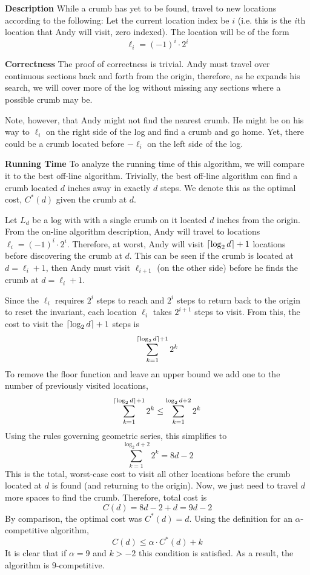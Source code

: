 \documentclass[12pt,twoside]{article}
\begin{document}
\begin{problems}

\problem  %

\begin{problemparts}

\problempart %
\textbf{Description} While a crumb has yet to be found, travel to new locations 
according to the following: Let the current location index be $i$ (i.e. this is 
the $i$th location that Andy will visit, zero indexed). The location will be of 
the form
$$ \ell_i = (-1)^i \cdot 2^i $$

\textbf{Correctness} The proof of correctness is trivial. Andy must travel over
continuous sections back and forth from the origin, therefore, as he expands 
his search, we will cover more of the log without missing any sections where a 
possible crumb may be. 

Note, however, that Andy might not find the nearest crumb. He might be on his 
way to $\ell_i$ on the right side of the log and find a crumb and go home. Yet,
there could be a crumb located before $-\ell_i$ on the left side of the log.

\textbf{Running Time} To analyze the running time of this algorithm, we will
compare it to the best off-line algorithm. Trivially, the best off-line
algorithm can find a crumb located $d$ inches away in exactly $d$ steps. We
denote this as the optimal cost, $C^*(d)$ given the crumb at $d$.

Let $L_d$ be a log with with a single crumb on it located $d$ inches from the
origin. From the on-line algorithm description, Andy will travel to locations
$\ell_i = (-1)^i \cdot 2^i$. Therefore, at worst, Andy will visit $\left\lceil 
\log_2 d \right\rceil + 1$ locations before discovering the crumb at $d$. This can be
seen if the crumb is located at $d = \ell_i + 1$, then Andy must visit 
$\ell_{i + 1}$ (on the other side) before he finds the crumb at $d = \ell_i 
+ 1$. 

Since the $\ell_i$ requires $2^i$ steps to reach and $2^i$ steps to return
back to the origin to reset the invariant, each location $\ell_i$ takes $2^{i
+ 1}$ steps to visit. From this, the cost to visit the $\left\lceil \log_2 d \right\rceil + 1$
steps is
$$ \sum_{k = 1}^{\left\lceil \log_2 d \right\rceil + 1} 2^k $$
To remove the floor function and leave an upper bound we add one to the
number of previously visited locations,
$$ \sum_{k = 1}^{\left\lceil \log_2 d \right\rceil + 1} 2^k \leq \sum_{k = 1}^{\log_2 d + 2} 
2^k $$
Using the rules governing geometric series, this simplifies to
$$\sum_{k = 1}^{\log_2 d + 2} 2^k = 8d - 2 $$
This is the total, worst-case cost to visit all other locations before the 
crumb located at $d$ is found (and returning to the origin). Now, we just 
need to travel $d$ more spaces to find the crumb. Therefore, total cost is
$$ C(d) = 8d - 2 + d = 9d - 2 $$
By comparison, the optimal cost was $C^*(d) = d$. Using the definition for
an $\alpha$-competitive algorithm,
$$ C(d) \leq \alpha \cdot C^*(d) + k $$
It is clear that if $\alpha = 9$ and $k > -2$ this condition is satisfied.
As a result, the algorithm is $9$-competitive.


\end{problemparts}
\end{problems}
\end{document}
